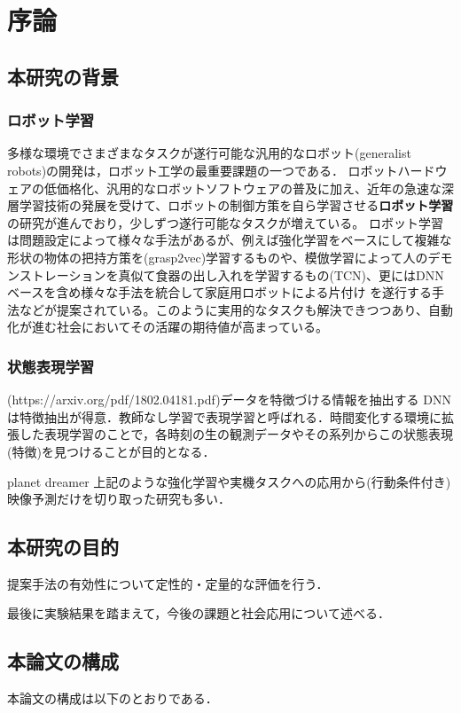 \chapter{序論}
\label{chap:introduction}
\section{本研究の背景}

\subsection{ロボット学習}

多様な環境でさまざまなタスクが遂行可能な汎用的なロボット(generalist robots)の開発は，ロボット工学の最重要課題の一つである．
ロボットハードウェアの低価格化、汎用的なロボットソフトウェアの普及に加え、近年の急速な深層学習技術の発展を受けて、ロボットの制御方策を自ら学習させる{\bf ロボット学習}の研究が進んでおり，少しずつ遂行可能なタスクが増えている。
ロボット学習は問題設定によって様々な手法があるが、例えば強化学習をベースにして複雑な形状の物体の把持方策を(grasp2vec)学習するものや、模倣学習によって人のデモンストレーションを真似て食器の出し入れを学習するもの(TCN)、更にはDNNベースを含め様々な手法を統合して家庭用ロボットによる片付け \cite{hatori2018interactively}を遂行する手法などが提案されている。このように実用的なタスクも解決できつつあり、自動化が進む社会においてその活躍の期待値が高まっている。

\subsection{状態表現学習}
(https://arxiv.org/pdf/1802.04181.pdf)データを特徴づける情報を抽出する
DNNは特徴抽出が得意．教師なし学習で表現学習と呼ばれる．時間変化する環境に拡張した表現学習のことで，各時刻の生の観測データやその系列からこの状態表現(特徴)を見つけることが目的となる．

planet dreamer
上記のような強化学習や実機タスクへの応用から(行動条件付き)映像予測だけを切り取った研究も多い．

\section{本研究の目的}


提案手法の有効性について定性的・定量的な評価を行う．

最後に実験結果を踏まえて，今後の課題と社会応用について述べる．

\section{本論文の構成}
本論文の構成は以下のとおりである．


